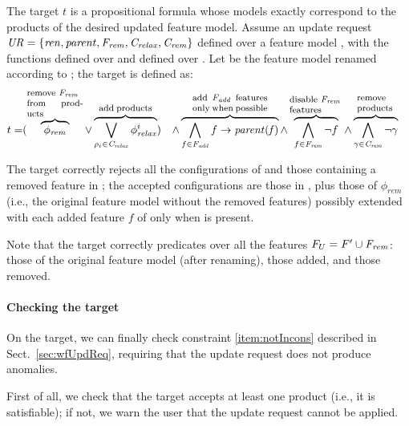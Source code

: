 \begin{tikzborder}{\cite{Gargantini16:validation}}
\begin{tikzborder}{\cite{gargantini_combinatorial_2017}}
\begin{tikzborder}{\cite{garn2019}}
\begin{tikzborder}{\cite{arcaini2019achieving}}
	\begin{mydef}\label{def:target}
		\bb The target $t$ is a propositional formula whose models exactly correspond to the products of the desired updated feature model. Assume an update request $\mathit{UR} = \{\mathit{ren}, \mathit{parent}, \mathit{F_{rem}}, \mathit{C_{relax}}, \mathit{C_{rem}}{}\}$ defined over a feature model \fm, with the functions \rename defined over \Ftbr and \parentna defined over \Fadd. Let \fmrenamed be the feature model renamed according to \rename; the target is defined as:\be
		\begin{align*} 
		t = & (\overbrace{\;\phi_{\mathit{rem}}\;}^{\parbox{18mm}{\footnotesize remove \Frem\\from products}} \vee \overbrace{\bigvee_{\rho_i \in \CFrelax} \phi^i_{\mathit{relax}}}^{\parbox{17mm}{\footnotesize add products}}) & \wedge
		& \overbrace{\bigwedge_{f \in \Fadd} f \rightarrow \parent{f}}^{\parbox{24mm}{\footnotesize add \Fadd features only when possible}} \wedge \overbrace{\bigwedge_{f \in \Frem} \neg f}^{\parbox{17mm}{\footnotesize disable \Frem\\ features}} \wedge \overbrace{\bigwedge_{\gamma \in \CFrem} \neg \gamma}^{\parbox{12mm}{\footnotesize remove products}}
		\end{align*}
	\end{mydef}
	
	\bb The target correctly rejects all the configurations of \CFrem and those containing a removed feature in \Frem; the accepted configurations are those in \CFrelax, plus those of $\phi_{\mathit{rem}}$ (i.e., the original feature model without the removed features) possibly extended with each added feature $f$ of \Fadd only when  is present.
	
	Note that the target correctly predicates over all the features $F_U = F^\prime \cup \mathit{F_{rem}}$: those of the original feature model (after renaming), those added, and those removed.\be
	
	\paragraph{Checking the target}
	
	\bb On the target, we can finally check constraint \ref{item:notIncons} described in Sect.~\ref{sec:wfUpdReq}, requiring that the update request does not produce anomalies.
	
	First of all, we check that the target accepts at least one product (i.e., it is satisfiable); if not, we warn the user that the update request cannot be applied.
	

\end{tikzborder}
\end{tikzborder}
\end{tikzborder}
\end{tikzborder}
